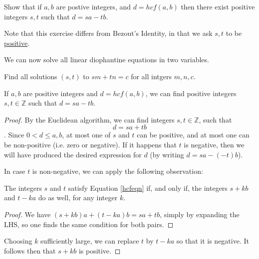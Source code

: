 \documentclass[11pt,dvipsnames]{book}
\numberwithin{equation}{section} %
\numberwithin{figure}{section} %
\numberwithin{table}{section} %
\begin{document}
\begin{exercise}
Show that if $a, b$ are postive integers, and $d=hcf(a,b)$ then there exist positive integers $s, t$ such that $d=sa-tb$.
\begin{remark} Note that this exercise differs from Bezout’s  Identity, in that we ask $s, t$ to be \underline{positive}.\end{remark}


We can now solve all linear diophantine equations in two variables. 

\begin{exercise}
Find all solutions $(s,t)$ to $sm+tn=c$ for all intgers $m,n,c$. 
\end{exercise}




%
\end{exercise}

\begin{solution}
\begin{claim} If $a,b$ are positive integers and $d=hcf(a,b)$, we can find positive integers $s, t \in\mathbb{Z}$ such that $d=sa-tb$.\end{claim}

\begin{proof}  By the Euclidean algorithm, we can find integers $s,t\in\mathbb{Z}$, such that
\begin{equation}d=sa+tb\label{hcfeqn}\end{equation}. Since $0<d\leq a,b$, at most one of $s$ and $t$ can be positive, and at most one can be non-positive (i.e. zero or negative).  If it happens that $t$ is negative, then we will have produced the desired expression for $d$ (by writing $d=sa - (-t)b$).

In case $t$ is non-negative, we can apply the following observation:
\begin{lemma} The integers $s$ and $t$ satisfy Equation \eqref{hcfeqn} if, and only if, the integers $s+kb$ and $t-ka$ do as well, for any integer $k$.\end{lemma}
\begin{proof} We have $(s+kb)a + (t-ka)b = sa+tb$, simply by expanding the LHS, so one finds the same condition for both pairs.\end{proof}

Choosing $k$ sufficiently large, we can replace $t$ by $t-ka$ so that it is negative.  It follows then that $s+kb$ is positive.
\end{proof}

\end{solution}
\end{document}
